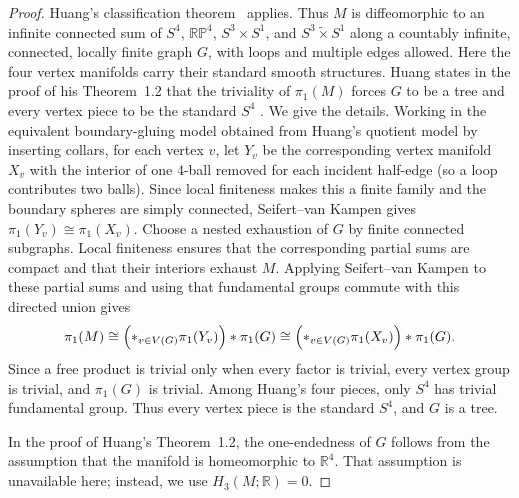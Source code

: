 \documentclass[12pt,oneside,a4paper]{article}
\theoremstyle{mytheorem}
\theoremstyle{remark}
\theoremstyle{definition}
\begin{document}
\begin{proof}
Huang's classification theorem~\cite[Theorem~1.1 and \S~1]{zbMATH07110928}
applies. Thus \(M\) is diffeomorphic to an infinite connected sum of
\(S^4\),
\(\mathbb{RP}^4\), \(S^3\times S^1\), and
\(S^3\widetilde{\times}S^1\) along a countably infinite, connected,
locally finite graph \(G\), with loops
and multiple edges allowed. Here the four vertex manifolds carry their standard
smooth structures. Huang states
in the proof of his Theorem~1.2 that the triviality of \(\pi_1(M)\) forces \(G\)
to be a tree and every vertex piece to be the standard \(S^4\)
\cite[\S~3]{zbMATH07110928}. We give the details. Working in the equivalent
boundary-gluing model obtained from Huang's quotient model by inserting collars,
for each vertex \(v\), let \(Y_v\) be
the corresponding vertex manifold \(X_v\) with the interior of one \(4\)-ball
removed for each incident half-edge (so a loop contributes two balls). Since
local finiteness makes this a finite family and the boundary spheres are simply
connected, Seifert--van Kampen gives \(\pi_1(Y_v)\cong\pi_1(X_v)\).
Choose a nested exhaustion of \(G\) by finite connected subgraphs. Local
finiteness ensures that the corresponding partial sums are compact and that
their interiors exhaust \(M\). Applying Seifert--van Kampen to these partial
sums and using that fundamental groups commute with this directed union gives
\[
        \pi_1(M)\cong
        \Bigl(*_{v\in V(G)}\pi_1(Y_v)\Bigr)*\pi_1(G)
        \cong
        \Bigl(*_{v\in V(G)}\pi_1(X_v)\Bigr)*\pi_1(G).
\]
Since a free product is trivial only when every factor is trivial, every
vertex group is trivial, and \(\pi_1(G)\) is trivial.
Among Huang's four pieces, only \(S^4\) has trivial fundamental group.
Thus every vertex piece is the standard \(S^4\), and \(G\) is a tree.

In the proof of Huang's Theorem~1.2, the one-endedness of \(G\) follows from
the assumption that the manifold is homeomorphic to \(\mathbb R^4\). That
assumption is unavailable here; instead, we use \(H_3(M;\mathbb R)=0\).


\end{proof}
\end{document}
